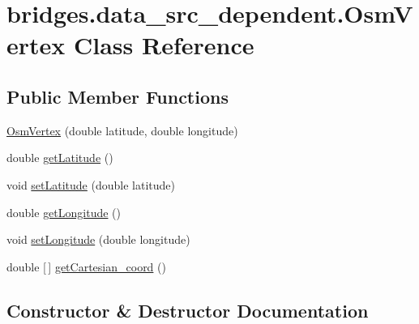\hypertarget{classbridges_1_1data__src__dependent_1_1_osm_vertex}{}\section{bridges.\+data\+\_\+src\+\_\+dependent.\+Osm\+Vertex Class Reference}
\label{classbridges_1_1data__src__dependent_1_1_osm_vertex}
\subsection*{Public Member Functions}
\begin{DoxyCompactItemize}
\item 
\hyperlink{classbridges_1_1data__src__dependent_1_1_osm_vertex_aa95185eb1ced2e59ebf3cf9cb64773ed}{Osm\+Vertex} (double latitude, double longitude)
\item 
double \hyperlink{classbridges_1_1data__src__dependent_1_1_osm_vertex_a6da7cbbd1f3d686af9974d5769d4a245}{get\+Latitude} ()
\item 
void \hyperlink{classbridges_1_1data__src__dependent_1_1_osm_vertex_afda8504609680c855ea81f0c679298e9}{set\+Latitude} (double latitude)
\item 
double \hyperlink{classbridges_1_1data__src__dependent_1_1_osm_vertex_a73ce32c2897be14aa893822ce4081f3d}{get\+Longitude} ()
\item 
void \hyperlink{classbridges_1_1data__src__dependent_1_1_osm_vertex_a2b4ac472641b5b206cff7db53ce3285b}{set\+Longitude} (double longitude)
\item 
double \mbox{[}$\,$\mbox{]} \hyperlink{classbridges_1_1data__src__dependent_1_1_osm_vertex_ab0921714d93d0fc416657e39a90c404e}{get\+Cartesian\+\_\+coord} ()
\end{DoxyCompactItemize}


\subsection{Constructor \& Destructor Documentation}
\mbox{\label{classbridges_1_1data__src__dependent_1_1_osm_vertex_aa95185eb1ced2e59ebf3cf9cb64773ed}} 
